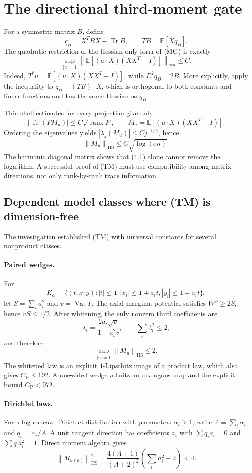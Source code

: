 \documentclass[11pt]{article}
\theoremstyle{definition}
\theoremstyle{remark}
\newcommand{\E}{\mathbb E}
\newcommand{\Var}{\operatorname{Var}}
\newcommand{\Tr}{\operatorname{Tr}}
\newcommand{\HS}{\mathrm{HS}}
\newcommand{\1}{\mathbf 1}
\newcommand{\CP}{C_{\mathrm P}}
\newcommand{\norm}[1]{\left\lVert #1\right\rVert}
\begin{document}
\section{The directional third-moment gate}

For a symmetric matrix \(B\), define
\[
 q_B=X^TBX-\Tr B,
 \qquad
 T B=\E[Xq_B].
\]
The quadratic restriction of the Hessian-only form of (MG) is exactly
\[
 \boxed{\qquad
 \sup_{|u|=1}
 \norm{\E[(u\cdot X)(XX^T-I)]}_{\HS}\le C.
 \qquad}                                              \tag{TM}
\]
Indeed, \(T^*u=\E[(u\cdot X)(XX^T-I)]\), while
\(D^2q_B=2B\).  More explicitly, apply the inequality to
\(q_B-(TB)\cdot X\), which is orthogonal to both constants and linear
functions and has the same Hessian as \(q_B\).

Thin-shell estimates for every projection give only
\[
 |\Tr(PM_u)|\le C\sqrt{\operatorname{rank}P},
 \qquad M_u=\E[(u\cdot X)(XX^T-I)].                  \tag{4.1}
\]
Ordering the eigenvalues yields
\(|\lambda_j(M_u)|\le Cj^{-1/2}\), hence
\[
                         \norm{M_u}_{\HS}\le C\sqrt{\log(en)}. \tag{4.2}
\]
The harmonic diagonal matrix shows that (4.1) alone cannot remove the
logarithm.  A successful proof of (TM) must use compatibility among matrix
directions, not only rank-by-rank trace information.

\subsection{Dependent model classes where (TM) is dimension-free}

The investigation established (TM) with universal constants for several
nonproduct classes.

\paragraph{Paired wedges.}
For
\[
 K_a=\{(t,x,y):|t|\le1,
 |x_i|\le1+a_it,
 |y_i|\le1-a_it\},
\]
let \(S=\sum_i a_i^2\) and \(v=\Var T\).  The axial marginal potential
satisfies \(W''\ge2S\), hence \(vS\le1/2\).  After whitening, the only
nonzero third coefficients are
\[
 \lambda_i=\frac{2a_i\sqrt v}{1+a_i^2v},
 \qquad \sum_i\lambda_i^2\le2,
\]
and therefore
\[
 \sup_{|u|=1}\norm{M_u}_{\HS}\le2.                  \tag{4.3}
\]
The whitened law is an explicit \(4\)-Lipschitz image of a product law,
which also gives \(\CP\le192\).  A one-sided wedge admits an analogous
map and the explicit bound \(\CP<972\).

\paragraph{Dirichlet laws.}
For a log-concave Dirichlet distribution with parameters
\(\alpha_i\ge1\), write \(A=\sum_i\alpha_i\) and
\(q_i=\alpha_i/A\).  A unit tangent direction has coefficients \(a_i\)
with \(\sum q_ia_i=0\) and \(\sum q_ia_i^2=1\).  Direct moment algebra gives
\[
 \norm{M_{u(a)}}_{\HS}^2
 =\frac{4(A+1)}{(A+2)^2}
   \left(\sum_i a_i^2-2\right)<4.                    \tag{4.4}
\]
\end{document}
